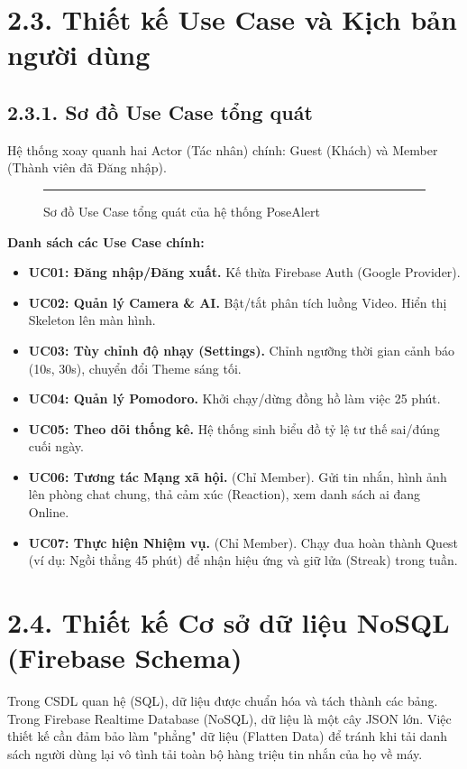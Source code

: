 \documentclass[12pt,a4paper]{report}
\begin{document}
\section{2.3. Thiết kế Use Case và Kịch bản người dùng}

\subsection{2.3.1. Sơ đồ Use Case tổng quát}
Hệ thống xoay quanh hai Actor (Tác nhân) chính: Guest (Khách) và Member (Thành viên đã Đăng nhập).

\begin{figure}[H]
    \centering
    \rule{0.9\textwidth}{7cm} 
    \caption{Sơ đồ Use Case tổng quát của hệ thống PoseAlert}
\end{figure}

\textbf{Danh sách các Use Case chính:}
\begin{itemize}
    \item \textbf{UC01: Đăng nhập/Đăng xuất.} Kế thừa Firebase Auth (Google Provider).
    \item \textbf{UC02: Quản lý Camera \& AI.} Bật/tắt phân tích luồng Video. Hiển thị Skeleton lên màn hình.
    \item \textbf{UC03: Tùy chỉnh độ nhạy (Settings).} Chỉnh ngưỡng thời gian cảnh báo (10s, 30s), chuyển đổi Theme sáng tối.
    \item \textbf{UC04: Quản lý Pomodoro.} Khởi chạy/dừng đồng hồ làm việc 25 phút.
    \item \textbf{UC05: Theo dõi thống kê.} Hệ thống sinh biểu đồ tỷ lệ tư thế sai/đúng cuối ngày.
    \item \textbf{UC06: Tương tác Mạng xã hội.} (Chỉ Member). Gửi tin nhắn, hình ảnh lên phòng chat chung, thả cảm xúc (Reaction), xem danh sách ai đang Online.
    \item \textbf{UC07: Thực hiện Nhiệm vụ.} (Chỉ Member). Chạy đua hoàn thành Quest (ví dụ: Ngồi thẳng 45 phút) để nhận hiệu ứng và giữ lửa (Streak) trong tuần.
\end{itemize}

\section{2.4. Thiết kế Cơ sở dữ liệu NoSQL (Firebase Schema)}
Trong CSDL quan hệ (SQL), dữ liệu được chuẩn hóa và tách thành các bảng. Trong Firebase Realtime Database (NoSQL), dữ liệu là một cây JSON lớn. Việc thiết kế cần đảm bảo làm "phẳng" dữ liệu (Flatten Data) để tránh khi tải danh sách người dùng lại vô tình tải toàn bộ hàng triệu tin nhắn của họ về máy.
\end{document}

